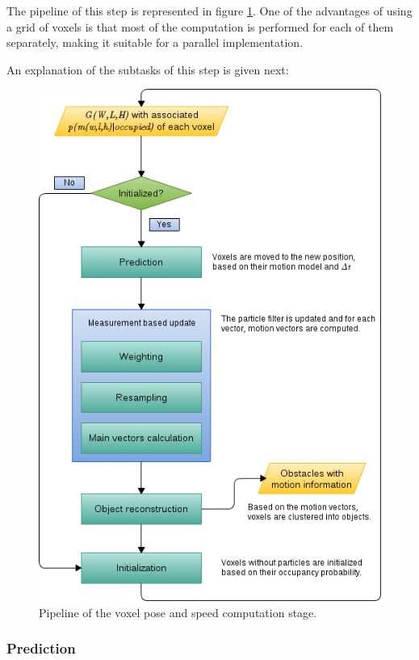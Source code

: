 The pipeline of this step is represented in figure \ref{fig:cp05_voxel_pose_speed_computation}. One of the advantages of using a grid of voxels is that most of the computation is performed for each of them separately, making it suitable for a parallel implementation. 

An explanation of the subtasks of this step is given next:

\begin{figure}[th]
  \centering
  \includegraphics{voxelPoseAndSpeedComputation}
  \caption{Pipeline of the voxel pose and speed computation stage.}\label{fig:cp05_voxel_pose_speed_computation}
\end{figure}

\subsubsection{Prediction}\label{ch:chapter05_01_04_01}

